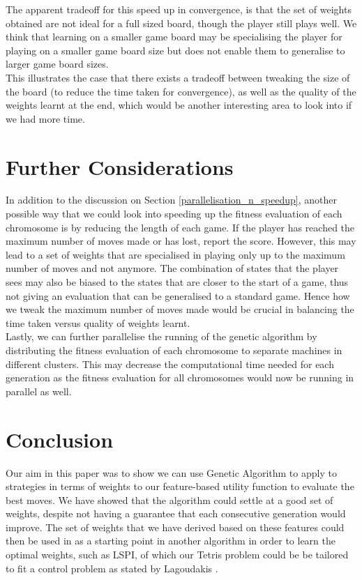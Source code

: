 \documentclass[a4paper,12pt,twocolumn]{article}
\begin{document}
The apparent tradeoff for this speed up in convergence, is that the set of weights
obtained are not ideal for a full sized board, though the player still plays well.
We think that learning on a smaller game board may be specialising the player for playing on
a smaller game board size but does not enable them to generalise to larger game board sizes.\\

This illustrates the case that there exists a tradeoff between tweaking the size
of the board (to reduce the time taken for convergence), as well as the quality of
the weights learnt at the end, which would be another interesting area to look into
if we had more time.

\section{Further Considerations}

In addition to the discussion on Section \ref{parallelisation_n_speedup},
another possible way that we could look into speeding up the fitness evaluation
of each chromosome is by reducing the length of each game. If the player has reached
the maximum number of moves made or has lost, report the score. However, this may
lead to a set of weights that are specialised in playing only up to the maximum
number of moves and not anymore. The combination of states that the player sees may
also be biased to the states that are closer to the start of a game, thus not
giving an evaluation that can be generalised to a standard game. Hence how we
tweak the maximum number of moves made would be crucial in balancing the
time taken versus quality of weights learnt.\\

Lastly, we can further parallelise the running of the genetic algorithm by distributing
the fitness evaluation of each chromosome to separate machines in different
clusters. This may decrease the computational time needed for each generation as the
fitness evaluation for all chromosomes would now be running in parallel as well.

\section{Conclusion}
Our aim in this paper was to show we can use Genetic Algorithm to apply to strategies
in terms of weights to our feature-based utility function to evaluate the best moves.
We have showed that the algorithm could settle at a good set of weights, despite
not having a guarantee that each consecutive generation would improve. The set of weights
that we have derived based on these features could then be used in as a starting point
in another algorithm in order to learn the optimal weights, such as LSPI, of which our
Tetris problem could be be tailored to fit a control problem as stated by Lagoudakis \cite{lagoudakis}.\\
\end{document}

